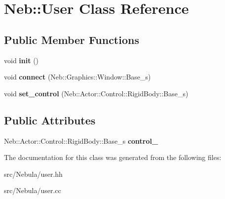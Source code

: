 \hypertarget{classNeb_1_1User}{\section{\-Neb\-:\-:\-User \-Class \-Reference}
\label{classNeb_1_1User}
}
\subsection*{\-Public \-Member \-Functions}
\begin{DoxyCompactItemize}
\item 
\hypertarget{classNeb_1_1User_a47530379dc6aa77e4a4097d19b3347de}{void {\bfseries init} ()}\label{classNeb_1_1User_a47530379dc6aa77e4a4097d19b3347de}

\item 
\hypertarget{classNeb_1_1User_a5e637a014414b530dde0c90f0122b305}{void {\bfseries connect} (\-Neb\-::\-Graphics\-::\-Window\-::\-Base\-\_\-s)}\label{classNeb_1_1User_a5e637a014414b530dde0c90f0122b305}

\item 
\hypertarget{classNeb_1_1User_ad193a4a8bdd4e1df8b7342b0838e7b52}{void {\bfseries set\-\_\-control} (\-Neb\-::\-Actor\-::\-Control\-::\-Rigid\-Body\-::\-Base\-\_\-s)}\label{classNeb_1_1User_ad193a4a8bdd4e1df8b7342b0838e7b52}

\end{DoxyCompactItemize}
\subsection*{\-Public \-Attributes}
\begin{DoxyCompactItemize}
\item 
\hypertarget{classNeb_1_1User_ad31a255b7b1a0107c94512db44fe63d5}{\-Neb\-::\-Actor\-::\-Control\-::\-Rigid\-Body\-::\-Base\-\_\-s {\bfseries control\-\_\-}}\label{classNeb_1_1User_ad31a255b7b1a0107c94512db44fe63d5}

\end{DoxyCompactItemize}


\-The documentation for this class was generated from the following files\-:\begin{DoxyCompactItemize}
\item 
src/\-Nebula/user.\-hh\item 
src/\-Nebula/user.\-cc\end{DoxyCompactItemize}
